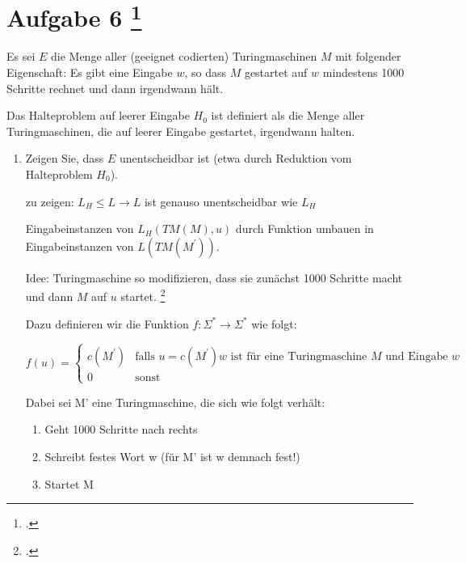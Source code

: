 \documentclass{bschlangaul-aufgabe}
\begin{document}
\section{Aufgabe 6
\footcite{examen:66115:2017:03}}

Es sei $E$ die Menge aller (geeignet codierten) Turingmaschinen $M$ mit
folgender Eigenschaft: Es gibt eine Eingabe $w$, so dass $M$ gestartet
auf $w$ mindestens 1000 Schritte rechnet und dann irgendwann hält.

Das Halteproblem auf leerer Eingabe $H_0$ ist definiert als die Menge
aller Turingmaschinen, die auf leerer Eingabe gestartet, irgendwann
halten.

\begin{enumerate}


\item Zeigen Sie, dass $E$ unentscheidbar ist (etwa durch Reduktion vom
Halteproblem $H_0$).

\begin{bAntwort}
zu zeigen: $L_H \leq L \rightarrow L$ ist genauso unentscheidbar wie $L_H$

Eingabeinstanzen von $L_H (TM(M), u)$ durch Funktion umbauen in
Eingabeinstanzen von $L (TM (M^\prime))$.

Idee: Turingmaschine so modifizieren, dass sie zunächst
1000 Schritte macht und dann $M$ auf $u$ startet.
\footcite[Seite 53]{theo:fs:4}

Dazu definieren wir die Funktion $f : \Sigma^* \rightarrow \Sigma^*$ wie
folgt:

\begin{equation*}
f(u) =
\begin{cases}
c(M^\prime) &
\text{falls }u = c(M^\prime)w\text{ ist für eine Turingmaschine }M\text{ und Eingabe }w\\

0 & \text{sonst}
\end{cases}
\end{equation*}

Dabei sei M’ eine Turingmaschine, die sich wie folgt verhält:
\begin{enumerate}
\item Geht 1000 Schritte nach rechts
\item Schreibt festes Wort w (für M’ ist w demnach fest!)
\item Startet M
\end{enumerate}


\end{bAntwort}
\end{enumerate}
\end{document}
